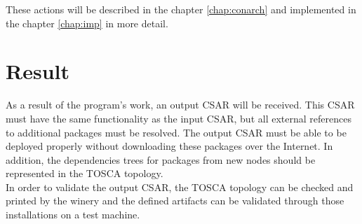 These actions will be described in the chapter \ref{chap:conarch} and implemented in the chapter \ref{chap:imp} in more detail.

\section*{Result}
As a result of the program's work, an output CSAR will be received. 
This CSAR must have the same functionality as the input CSAR, but all external references to additional packages must be resolved.
The output CSAR must be able to be deployed properly without downloading these packages over the Internet. 
In addition, the dependencies trees for packages from new nodes should be represented in the TOSCA topology.\\

In order to validate the output CSAR, the TOSCA topology can be checked and printed by the winery and the defined artifacts can be validated through those installations on a test machine. 